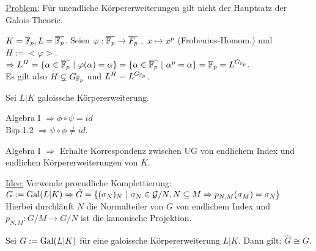 \underline{Problem:} Für unendliche Körpererweiterungen gilt nicht der Hauptsatz der Galois-Theorie.

\begin{Bsp}
$K=\mathbb{F}_p, L=\overline{\mathbb{F}_p}$. Seien $\varphi : \overline{\mathbb{F}_p} \to \overline{F_p} \ , \ x \mapsto x^p $ (Frobenius-Homom.) und $H:= < \varphi >$.\\
$\Rightarrow L^H=\{\alpha \in \overline{\F_p} \ | \ \varphi(\alpha)=\alpha\} = \{ \alpha \in \overline{\F_p} \ | \ \alpha^p = \alpha \} = \F_p = L^{G_{\F_p}}$.\\
Es gilt also $H \subsetneq G_{\mathbb{F}_p}$ und $L^H=L^{G_{\mathbb{F}_p}}$.
\end{Bsp}

\begin{Err}
Sei $L|K$ galoissche Körpererweiterung.\\
\end{Err}

Algebra I $\Rightarrow \phi \circ \psi = id$\\
Bsp 1.2 $\Rightarrow \psi \circ \phi \neq id.$

\begin{Bem}
Algebra I $\Rightarrow$ Erhalte Korrespondenz zwischen UG von endlichem Index und endlichen Körpererweiterungen von $K$.
\end{Bem}

\underline{Idee:} Verwende proendliche Komplettierung:\\
$G:=\operatorname{Gal}(L|K) \Rightarrow \hat{G}= \{ (\sigma_N)_N \ | \ \sigma_N \in \mathcal{G}/N, N \subseteq M \Rightarrow p_{N,M}(\sigma_M)=\sigma_N\}$\\
Hierbei durchläuft $N$ die Normalteiler von $G$ von endlichem Index und $p_{N,M}: G/M \to G/N$ ist die kanonische Projektion.

\begin{Prop}
Sei $G:=\operatorname{Gal}(L|K)$ für eine galoissche Körpererweiterung $L|K$. Dann gilt: $\hat{G} \cong G$.
\end{Prop}